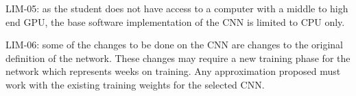 LIM-05: as the student does not have access to a computer with a middle to high end GPU, the base software
implementation of the CNN is limited to CPU only.

LIM-06: some of the changes to be done on the CNN are changes to the original definition of the network.
These changes may require a new training phase for the network which represents weeks on training.
Any approximation proposed must work with the existing training weights for the selected CNN.



            

